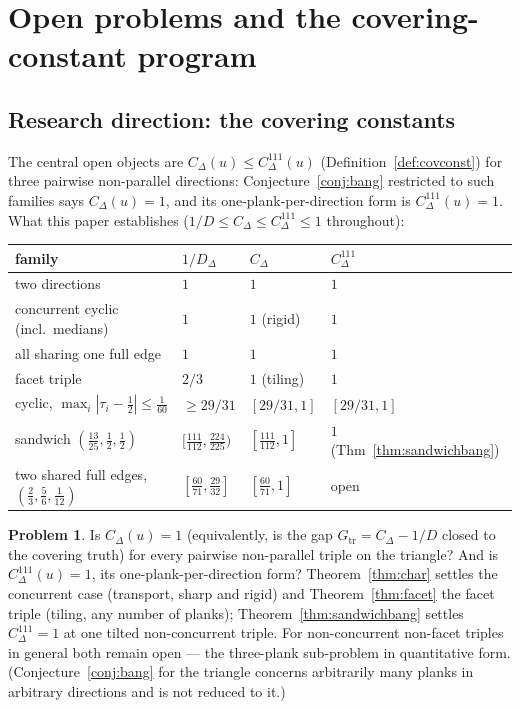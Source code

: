 \documentclass{aims}
\numberwithin{equation}{section}
\theoremstyle{plain}
\theoremstyle{definition}
\newtheorem{problem}[theorem]{Problem}
\theoremstyle{remark}
\begin{document}
\section{Open problems and the covering-constant program}
\label{sec:problems}

\subsection*{Research direction: the covering constants}
The central open objects are $C_\Delta(u)\le C^{111}_\Delta(u)$
(Definition~\ref{def:covconst}) for three pairwise non-parallel directions:
Conjecture~\ref{conj:bang} restricted to such families says $C_\Delta(u)=1$,
and its one-plank-per-direction form is $C^{111}_\Delta(u)=1$. What this paper
establishes ($1/D\le C_\Delta\le C^{111}_\Delta\le1$ throughout):

\begin{center}
\begin{tabular}{@{}llll@{}}
\hline
family & $1/D_\Delta$ & $C_\Delta$ & $C^{111}_\Delta$\\
\hline
two directions & $1$ & $1$ & $1$\\
concurrent cyclic (incl.\ medians) & $1$ & $1$ (rigid) & $1$\\
all sharing one full edge & $1$ & $1$ & $1$\\
facet triple & $2/3$ & $1$ (tiling) & $1$\\
cyclic, $\max_i|\tau_i-\tfrac12|\le\tfrac1{60}$ & $\ge29/31$ & $[29/31,1]$
 & $[29/31,1]$\\
sandwich $(\tfrac{13}{25},\tfrac12,\tfrac12)$ & $[\tfrac{111}{112},
\tfrac{224}{225})$ & $[\tfrac{111}{112},1]$ & $1$ (Thm~\ref{thm:sandwichbang})\\
two shared full edges, $(\tfrac23,\tfrac56,\tfrac1{12})$
 & $[\tfrac{60}{71},\tfrac{29}{32}]$ & $[\tfrac{60}{71},1]$ & open\\
\hline
\end{tabular}
\end{center}

\begin{problem}\label{prob:covconst}
Is $C_\Delta(u)=1$ (equivalently, is the gap $G_{\mathrm{tr}}=C_\Delta-1/D$
closed to the covering truth) for every pairwise non-parallel triple on the
triangle? And is $C^{111}_\Delta(u)=1$, its one-plank-per-direction form?
Theorem~\ref{thm:char} settles the concurrent case (transport, sharp and
rigid) and Theorem~\ref{thm:facet} the facet triple (tiling, any number of
planks); Theorem~\ref{thm:sandwichbang} settles $C^{111}_\Delta=1$ at one
tilted non-concurrent triple. For non-concurrent non-facet triples in general
both remain open --- the three-plank sub-problem in quantitative form.
(Conjecture~\ref{conj:bang} for the triangle concerns arbitrarily many planks
in arbitrary directions and is not reduced to it.)
\end{problem}
\end{document}
